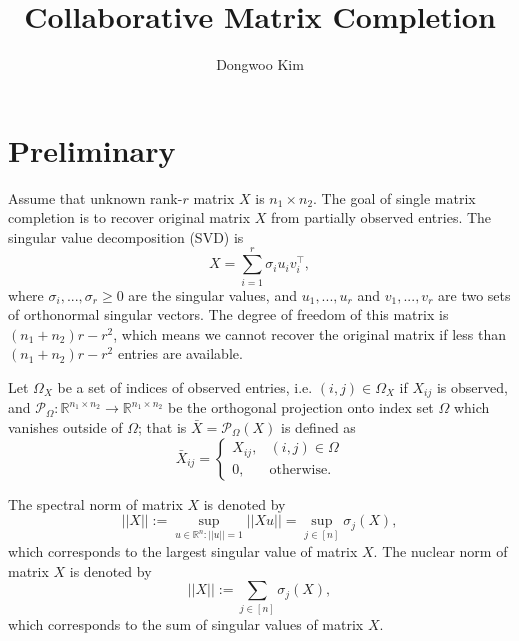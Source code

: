 \documentclass{article} %
\title{Collaborative Matrix Completion}
\author{
Dongwoo Kim
}
\theoremstyle{definition}
\newcommand\mc{\mathcal} %
\begin{document}
\maketitle

\section{Preliminary}
Assume that unknown rank-$r$ matrix $X$ is $n_1 \times n_2$. The goal of single matrix completion is to recover original matrix $X$ from partially observed entries. The singular value decomposition (SVD) is
\begin{equation}
X = \sum_{i=1}^{r}\sigma_i u_i v_i^\top,
\end{equation}
where $\sigma_i,...,\sigma_r \geq 0$ are the singular values, and $u_1,...,u_r$ and $v_1,...,v_r$ are two sets of orthonormal singular vectors. The degree of freedom of this matrix is $(n_1+n_2)r - r^2$, which means we cannot recover the original matrix if less than $(n_1+n_2)r - r^2$ entries are available.  

Let $\Omega_X$ be a set of indices of observed entries, i.e. $(i,j) \in \Omega_X$ if $X_{ij}$ is observed, and $\mc{P}_{\Omega}: \mathbb{R}^{n_1\times n_2} \rightarrow \mathbb{R}^{n_1\times n_2}$ be the orthogonal projection onto index set $\Omega$ which vanishes outside of $\Omega$; that is $\bar{X} = \mc{P}_{\Omega}(X)$ is defined as
\begin{equation}
\bar{X}_{ij} = \left\{
  \begin{array}{lr}
    X_{ij}, & (i,j) \in \Omega\\
    0, & \text{otherwise}.
  \end{array}
\right.
\end{equation}

The spectral norm of matrix $X$ is denoted by
\begin{equation}
||X|| := \sup_{u\in \mathbb{R}^n:||u||=1}||Xu|| = \sup_{j\in[n]}\sigma_j(X),
\end{equation}
which corresponds to the largest singular value of matrix $X$. The nuclear norm of matrix $X$ is denoted by
\begin{equation}
||X|| := \sum_{j\in[n]}\sigma_j(X),
\end{equation}
which corresponds to the sum of singular values of matrix $X$.
\end{document}
